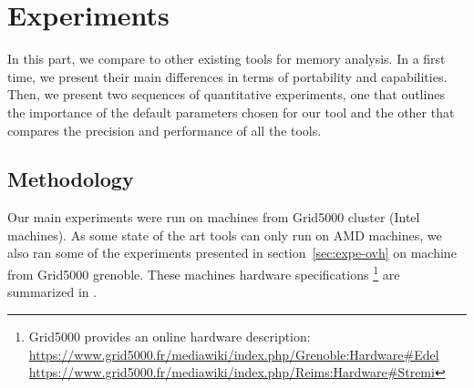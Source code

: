 \section{Experiments}
\label{sec:expe}

In this part, we compare \Moca to other existing tools for memory analysis. In a first time, we present their main differences in terms of portability
and capabilities. Then, we present two sequences of quantitative experiments, one that outlines the importance of the default parameters chosen for our tool
and the other that compares the precision and performance of all the tools.


\subsection{Methodology}
\label{sec:exp-methodo}


Our main experiments were run on  machines from Grid5000 \Edel
cluster (Intel machines).
    As some state of the art tools can only run on AMD machines, we also ran
    some of the experiments presented in section~\ref{sec:expe-ovh} on
    \Stremi machine from Grid5000 grenoble.
    These machines hardware specifications%
   \footnote{Grid5000 provides an online hardware description:\\
       \url{https://www.grid5000.fr/mediawiki/index.php/Grenoble:Hardware\#Edel}
       \\\url{https://www.grid5000.fr/mediawiki/index.php/Reims:Hardware\#Stremi}}
    are summarized in .

